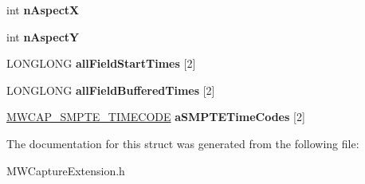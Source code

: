 \begin{DoxyCompactItemize}
\item 
\hypertarget{struct__MWCAP__VIDEO__FRAME__INFO_a6f9234c6fff33d2ae14de23bd9a1cfdc}{int {\bfseries n\-Aspect\-X}}\label{struct__MWCAP__VIDEO__FRAME__INFO_a6f9234c6fff33d2ae14de23bd9a1cfdc}

\item 
\hypertarget{struct__MWCAP__VIDEO__FRAME__INFO_a9dadde8a2021749712647945a2766964}{int {\bfseries n\-Aspect\-Y}}\label{struct__MWCAP__VIDEO__FRAME__INFO_a9dadde8a2021749712647945a2766964}

\item 
\hypertarget{struct__MWCAP__VIDEO__FRAME__INFO_a225742e848770d7dcf5cb5068a6a156d}{L\-O\-N\-G\-L\-O\-N\-G {\bfseries all\-Field\-Start\-Times} \mbox{[}2\mbox{]}}\label{struct__MWCAP__VIDEO__FRAME__INFO_a225742e848770d7dcf5cb5068a6a156d}

\item 
\hypertarget{struct__MWCAP__VIDEO__FRAME__INFO_a782f6d35f59fb7ff91257296a344b4a9}{L\-O\-N\-G\-L\-O\-N\-G {\bfseries all\-Field\-Buffered\-Times} \mbox{[}2\mbox{]}}\label{struct__MWCAP__VIDEO__FRAME__INFO_a782f6d35f59fb7ff91257296a344b4a9}

\item 
\hypertarget{struct__MWCAP__VIDEO__FRAME__INFO_ab5e526466dafddfa560b8bdaf16dc7c0}{\hyperlink{struct__MWCAP__SMPTE__TIMECODE}{M\-W\-C\-A\-P\-\_\-\-S\-M\-P\-T\-E\-\_\-\-T\-I\-M\-E\-C\-O\-D\-E} {\bfseries a\-S\-M\-P\-T\-E\-Time\-Codes} \mbox{[}2\mbox{]}}\label{struct__MWCAP__VIDEO__FRAME__INFO_ab5e526466dafddfa560b8bdaf16dc7c0}

\end{DoxyCompactItemize}


The documentation for this struct was generated from the following file\-:\begin{DoxyCompactItemize}
\item 
M\-W\-Capture\-Extension.\-h\end{DoxyCompactItemize}
